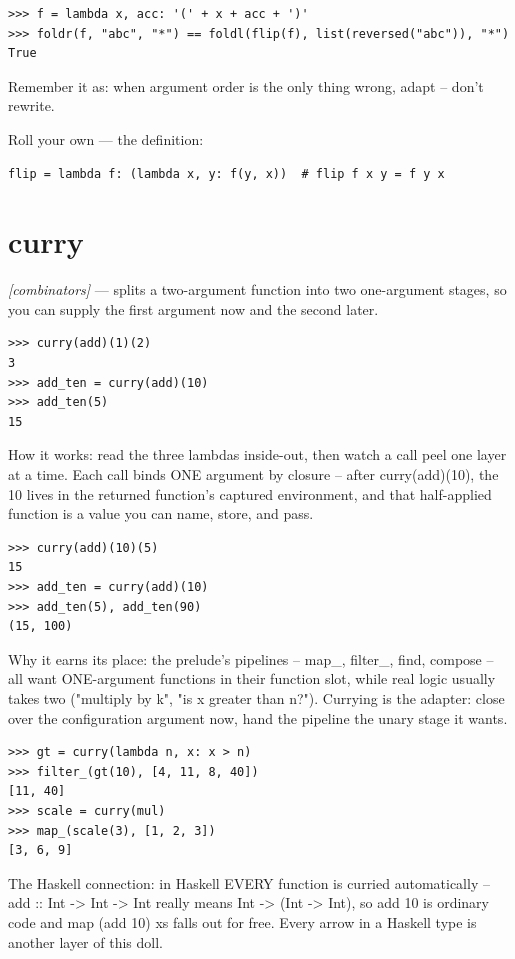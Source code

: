 \documentclass[11pt,letterpaper]{book}
\begin{document}
\begin{lstlisting}[style=spec]
>>> f = lambda x, acc: '(' + x + acc + ')'
>>> foldr(f, "abc", "*") == foldl(flip(f), list(reversed("abc")), "*")
True
\end{lstlisting}

Remember it as: when argument order is the only thing wrong, adapt -- don't rewrite.


Roll your own --- the definition:

\begin{lstlisting}[style=code]
flip = lambda f: (lambda x, y: f(y, x))  # flip f x y = f y x
\end{lstlisting}

\section{curry}
\noindent\textit{[combinators]} --- splits a two-argument function into two one-argument stages, so you can supply the first argument now and the second later.
\begin{lstlisting}[style=spec]
>>> curry(add)(1)(2)
3
>>> add_ten = curry(add)(10)
>>> add_ten(5)
15
\end{lstlisting}

How it works: read the three lambdas inside-out, then watch a call peel one layer at a time. Each call binds ONE argument by closure -- after curry(add)(10), the 10 lives in the returned function's captured environment, and that half-applied function is a value you can name, store, and pass.

\begin{lstlisting}[style=spec]
>>> curry(add)(10)(5)
15
>>> add_ten = curry(add)(10)
>>> add_ten(5), add_ten(90)
(15, 100)
\end{lstlisting}

Why it earns its place: the prelude's pipelines -- map\_, filter\_, find, compose -- all want ONE-argument functions in their function slot, while real logic usually takes two ("multiply by k", "is x greater than n?"). Currying is the adapter: close over the configuration argument now, hand the pipeline the unary stage it wants.

\begin{lstlisting}[style=spec]
>>> gt = curry(lambda n, x: x > n)
>>> filter_(gt(10), [4, 11, 8, 40])
[11, 40]
>>> scale = curry(mul)
>>> map_(scale(3), [1, 2, 3])
[3, 6, 9]
\end{lstlisting}

The Haskell connection: in Haskell EVERY function is curried automatically -- add :: Int -> Int -> Int really means Int -> (Int -> Int), so add 10 is ordinary code and map (add 10) xs falls out for free. Every arrow in a Haskell type is another layer of this doll.
\end{document}
